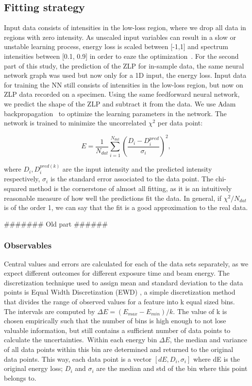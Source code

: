 \subsection{Fitting strategy}
%
Input data consists of intensities in the low-loss region, 
where we drop all data in regions with zero intensity. As unscaled input variables
can result in a slow or unstable learning process,
energy loss is scaled between [-1,1] and spectrum intensities between [0.1, 0.9]
in order to eaze the optimization~\cite{Ball:2008by}.
%
For the second part of this study, the prediction of the ZLP for in-sample data,
the same neural network graph was used but now only for a 1D input, the energy loss. 
%
Input data for training the NN still consists of intensities in the low-loss region, 
but now on ZLP data recorded on a specimen. Using the same feedforward neural network,
we predict the shape of the ZLP and subtract it from the data.
%
We use Adam backpropagation~\cite{Adam} to optimize the learning parameters in the network. 
The network is trained to minimize the uncorrelated $\chi^2$ per data point:

\begin{equation}\label{eq:chi2}
    E = \frac{1}{N_{dat}}\sum_{i=1}^{N_{dat}}\left(\frac{D_i - D_i^{pred}}{\sigma_i}\right)^2, 
\end{equation}

where $D_i, D_i^{pred(k)}$ are the input intensity and the predicted intensity respectively,
$\sigma_i$ is the standard error associated to the data point. 
%
The chi-squared method is the cornerstone of almost all fitting, as it is an intuitively 
reasonable measure of how well the predictions fit the data.
In general, if $\chi^2/N_{dat}$ is of the order 1, we can say that the fit is a 
good approximation to the real data. 
%



\newpage


####### Old part ######
\subsubsection*{Observables}
Central values and errors are calculated for each of the data sets separately, as we expect different outcomes for different exposure time and beam energy. The discretization technique used to assign mean and standard deviation to the data points is Equal Width Discretization (EWD) \cite{Dash:2011}, a simple discretization method that divides the range of observed values for a feature into k equal sized bins. The intervals are computed by 
$\Delta E = (E_{max} - E_{min}) / k$. The value of k is chosen empirically such that the number of bins is high enough to not lose valuable information, but still contains a sufficient number of data points to calculate the uncertainties.\
 Within each energy bin $\Delta E$, the median and variance of all data points within this bin are determined and returned to the original data points. This way, each data point is a vector $[dE, D_i, \sigma_i]$ where dE is the original energy loss; $D_i$ and $\sigma_i$ are the median and std of the bin where this point belongs to. 


